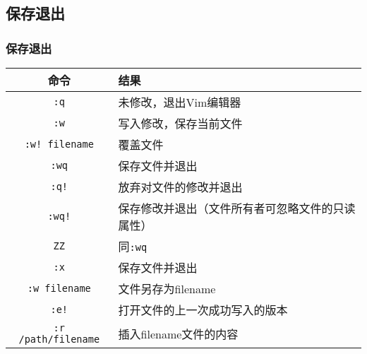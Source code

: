 \subsection{保存退出}
\begin{frame}
  \frametitle{\alert{保存退出}}
  \begin{table}
    \centering
    \begin{tabularx}{\textwidth}{cX}
      \hline
      \rowcolor{blue!50}命令 & 结果\\
      \hline
      \verb|:q| & 未修改，退出Vim编辑器\\
      \verb|:w| & 写入修改，保存当前文件\\
      \verb|:w! filename| & 覆盖文件\\
      \verb|:wq| & 保存文件并退出\\
      \verb|:q!| & 放弃对文件的修改并退出\\
      \verb|:wq!| & 保存修改并退出（文件所有者可忽略文件的只读属性）\\
      \verb|ZZ| & 同\verb|:wq|\\
      \verb|:x| & 保存文件并退出\\
      \verb|:w filename| & 文件另存为filename\\
      \verb|:e!| & 打开文件的上一次成功写入的版本\\
      \verb|:r /path/filename| & 插入filename文件的内容\\
      \hline
    \end{tabularx}
  \end{table}
\end{frame}

